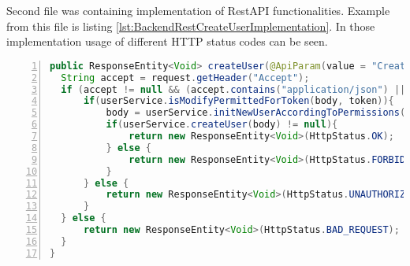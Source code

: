 Second file was containing implementation of RestAPI functionalities. Example from this file is listing \ref{lst:BackendRestCreateUserImplementation}. In those implementation usage of different HTTP status codes can be seen.

\begin{lstlisting}[breaklines=true, numbers=left, stepnumber=1, label={lst:BackendRestCreateUserImplementation}, caption={Create user implementation},language=Java]
public ResponseEntity<Void> createUser(@ApiParam(value = "Created user object" ,required=true )  @Valid @RequestBody User body,@ApiParam(value = "") @Valid @RequestParam(value = "token", required = false) String token) {
  String accept = request.getHeader("Accept");
  if (accept != null && (accept.contains("application/json") || accept.contains("*/*")) ){
      if(userService.isModifyPermittedForToken(body, token)){
          body = userService.initNewUserAccordingToPermissions(body, token);
          if(userService.createUser(body) != null){
              return new ResponseEntity<Void>(HttpStatus.OK);
          } else {
              return new ResponseEntity<Void>(HttpStatus.FORBIDDEN);
          }
      } else {
          return new ResponseEntity<Void>(HttpStatus.UNAUTHORIZED);
      }
  } else {
      return new ResponseEntity<Void>(HttpStatus.BAD_REQUEST);
  }
}
\end{lstlisting}
